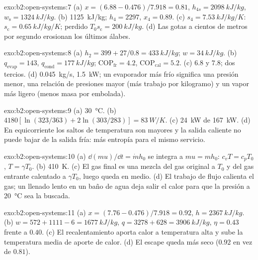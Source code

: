 \begin{solution}{exo:b2:open-systems:7}
(a) $x = (6.88 - 0.476)/7.918 = 0.81$, $h_{4s} = \qty{2098}{kJ/kg}$, $w_{\text{s}} =
\qty{1324}{kJ/kg}$. (b) \qty{1125}{kJ/kg}; $h_4 = 2297$, $x_4 = 0.89$. (c) $s_4 =
\qty{7.53}{kJ/kg/K}$: $s_{\text{c}} = \qty{0.65}{kJ/kg/K}$; perdido $T_0s_{\text{c}} =
\qty{200}{kJ/kg}$. (d) Las gotas a cientos de metros por segundo erosionan los
últimos álabes.
\end{solution}

\begin{solution}{exo:b2:open-systems:8}
(a) $h_2 = 399 + 27/0.8 = \qty{433}{kJ/kg}$; $w = \qty{34}{kJ/kg}$. (b) $q_{\text{evap}}
= 143$, $q_{\text{cond}} = \qty{177}{kJ/kg}$; $\mathrm{COP}_{\text{fr}} = 4.2$,
$\mathrm{COP}_{\text{cal}} = 5.2$. (c) $6.8$ y $7.8$; dos tercios. (d) \qty{0.045}{kg/s},
\qty{1.5}{kW}; un evaporador más frío significa una presión menor, una
relación de presiones mayor (más trabajo por kilogramo) y un vapor más ligero (menos
masa por embolada).
\end{solution}

\begin{solution}{exo:b2:open-systems:9}
(a) \qty{30}{\celsius}. (b) $4180[\ln(323/363) + 2\ln(303/283)] = \qty{83}{W/K}$.
(c) \qty{24}{kW} de \qty{167}{kW}. (d) En equicorriente los saltos de temperatura son
mayores y la salida caliente no puede bajar de la salida fría: más
entropía para el mismo servicio.
\end{solution}

\begin{solution}{exo:b2:open-systems:10}
(a) $\dd(mu)/\dd t = \dot m h_0$ se integra a $mu = mh_0$: $c_vT = c_pT_0$,
$T = \gamma T_0$. (b) \qty{410}{K}. (c) El gas final es una mezcla del
gas original a $T_0$ y del gas entrante calentado a $\gamma T_0$, luego
queda en medio. (d) El trabajo de flujo calienta el gas; un llenado lento en un baño
de agua deja salir el calor para que la presión a \qty{20}{\celsius} sea la
buscada.
\end{solution}

\begin{solution}{exo:b2:open-systems:11}
(a) $x = (7.76 - 0.476)/7.918 = 0.92$, $h = \qty{2367}{kJ/kg}$. (b) $w = 572 + 1111
- 6 = \qty{1677}{kJ/kg}$, $q = 3278 + 628 = \qty{3906}{kJ/kg}$, $\eta = 0.43$
frente a $0.40$. (c) El recalentamiento aporta calor a temperatura alta y
sube la temperatura media de aporte de calor. (d) El escape queda más seco
($0.92$ en vez de $0.81$).
\end{solution}

